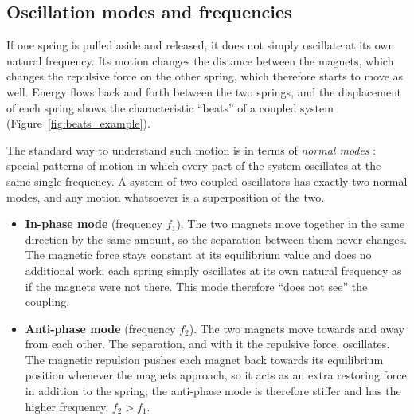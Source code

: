 \subsection{Oscillation modes and frequencies}

If one spring is pulled aside and released, it does not simply oscillate at its own natural frequency. Its motion changes the distance between the magnets, which changes the repulsive force on the other spring, which therefore starts to move as well. Energy flows back and forth between the two springs, and the displacement of each spring shows the characteristic ``beats'' of a coupled system (Figure~\ref{fig:beats_example}).

The standard way to understand such motion is in terms of \emph{normal modes} \cite{taylor,french}: special patterns of motion in which every part of the system oscillates at the same single frequency. A system of two coupled oscillators has exactly two normal modes, and any motion whatsoever is a superposition of the two.

\begin{itemize}
\item \textbf{In-phase mode} (frequency $f_1$). The two magnets move together in the same direction by the same amount, so the separation between them never changes. The magnetic force stays constant at its equilibrium value and does no additional work; each spring simply oscillates at its own natural frequency as if the magnets were not there. This mode therefore ``does not see'' the coupling.
\item \textbf{Anti-phase mode} (frequency $f_2$). The two magnets move towards and away from each other. The separation, and with it the repulsive force, oscillates. The magnetic repulsion pushes each magnet back towards its equilibrium position whenever the magnets approach, so it acts as an extra restoring force in addition to the spring; the anti-phase mode is therefore stiffer and has the higher frequency, $f_2>f_1$.
\end{itemize}

